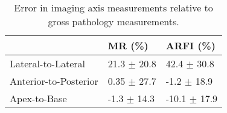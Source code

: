 \begin{table}
\centering
\caption{Error in imaging axis measurements relative to gross pathology measurements.}
\begin{tabular}{|l|l|l|} \hline
 & MR (\%) & ARFI (\%) \\ \hline
Lateral-to-Lateral & 21.3 $\pm$ 20.8 & 42.4 $\pm$ 30.8 \\
Anterior-to-Posterior & 0.35 $\pm$ 27.7 & -1.2 $\pm$ 18.9 \\
Apex-to-Base & -1.3 $\pm$ 14.3 & -10.1 $\pm$ 17.9 \\
\hline
\end{tabular}
\label{tab:mr_arfi_path_axes}
\end{table}
